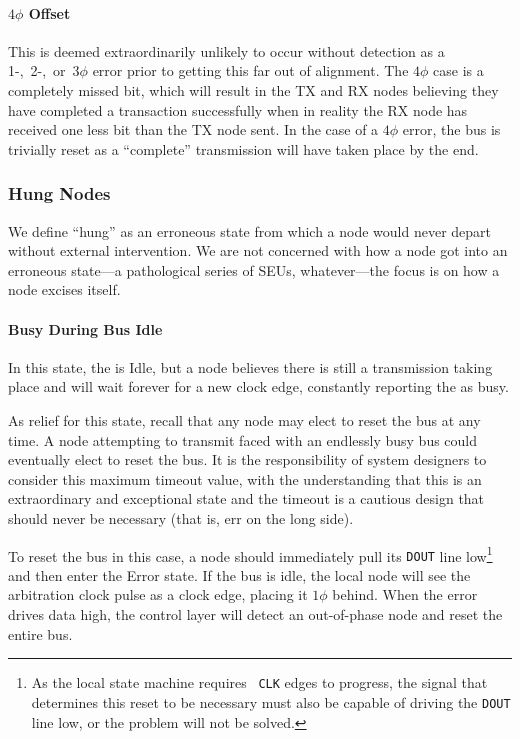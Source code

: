 \paragraph{$4\phi$ Offset}
This is deemed extraordinarily unlikely to occur without detection as a
1-,~2-,~or~$3\phi$ error prior to getting this far out of alignment.
The $4\phi$ case is a
completely missed bit, which will result in the TX and RX nodes believing they
have completed a transaction successfully when in reality the RX node has
received one less bit than the TX node sent. In the case of a $4\phi$ error,
the bus is trivially reset as a ``complete'' transmission will have taken place
by the end.

\subsubsection{Hung Nodes}
\label{sec:reset-hung}
We define ``hung'' as an erroneous state from which a node would never depart
without external intervention. We are not concerned with how a node got into
an erroneous state---a pathological series of SEUs, whatever---the focus is on
how a node excises itself.

\paragraph{Busy During Bus Idle}
In this state, the \bus is Idle, but a node believes there is still a
transmission taking place and will wait forever for a new clock edge,
constantly reporting the \bus as busy.

As relief for this state, recall that any node may elect to reset the bus at
any time. A node attempting to transmit faced with an endlessly busy bus could
eventually elect to reset the bus. It is the responsibility of system
designers to consider this maximum timeout value, with the understanding that
this is an extraordinary and exceptional state and the timeout is a cautious
design that should never be necessary (that is, err on the long side).

To reset the bus in this case, a node should immediately pull its {\tt DOUT}
line low\footnote{
  As the local state machine requires \bus~{\tt CLK} edges to progress, the
  signal that determines this reset to be necessary must also be capable of
  driving the {\tt DOUT} line low, or the problem will not be solved.
} and then enter the {\sc Error} state. If the bus is idle, the local node
will see the arbitration clock pulse as a clock edge, placing it $1\phi$
behind. When the {\sc error} drives data high, the control layer will detect
an out-of-phase node and reset the entire bus.

